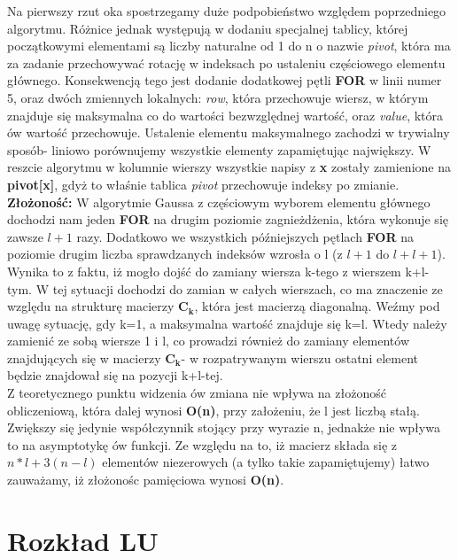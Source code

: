 \documentclass[a4paper,14pt]{report}
\begin{document}
  Na pierwszy rzut oka spostrzegamy duże podpobieństwo względem poprzedniego algorytmu. Różnice jednak występują w dodaniu specjalnej tablicy, której początkowymi elementami są liczby naturalne od 1 do n o nazwie \textit{pivot}, która ma za zadanie przechowywać rotację w indeksach po ustaleniu częściowego elementu głównego. Konsekwencją tego jest dodanie dodatkowej pętli \textbf{FOR} w linii numer 5, oraz dwóch zmiennych lokalnych: \textit{row}, która przechowuje wiersz, w którym znajduje się maksymalna co do wartości bezwzględnej wartość, oraz \textit{value}, która ów wartość przechowuje. Ustalenie elementu maksymalnego zachodzi w trywialny sposób- liniowo porównujemy wszystkie elementy zapamiętując największy. W reszcie algorytmu w kolumnie wierszy wszystkie napisy z \textbf{x} zostały zamienione na \textbf{pivot[x]}, gdyż to właśnie tablica \textit{pivot} przechowuje indeksy po zmianie.
  \textbf{Złożoność:}
  W algorytmie Gaussa z częściowym wyborem elementu głównego dochodzi nam jeden \textbf{FOR} na drugim poziomie zagnieżdżenia, która wykonuje się zawsze $l+1$ razy. Dodatkowo we wszystkich późniejszych pętlach \textbf{FOR} na poziomie drugim liczba sprawdzanych indeksów wzrosła o l (z $l+1$ do $l+l+1$). Wynika to z faktu, iż mogło dojść do zamiany wiersza k-tego z wierszem k+l-tym. W tej sytuacji dochodzi do zamian w całych wierszach, co ma znaczenie ze względu na strukturę macierzy $\mathbf{C_{k}}$, która jest macierzą diagonalną. Weźmy pod uwagę sytuację, gdy k=1, a maksymalna wartość znajduje się k=l. Wtedy należy zamienić ze sobą wiersze 1 i l, co prowadzi również do zamiany elementów znajdujących się w macierzy $\mathbf{C_{k}}$- w rozpatrywanym wierszu ostatni element będzie znajdował się na pozycji k+l-tej. \\
  Z teoretycznego punktu widzenia ów zmiana nie wpływa na złożoność obliczeniową, która dalej wynosi \textbf{O(n)}, przy założeniu, że l jest liczbą stałą. Zwiększy się jedynie współczynnik stojący przy wyrazie n, jednakże nie wpływa to na asymptotykę ów funkcji.
  Ze względu na to, iż macierz składa się z $n*l+3(n-l)$ elementów niezerowych (a tylko takie zapamiętujemy) łatwo zauważamy, iż złożonośc pamięciowa wynosi \textbf{O(n)}. 



\chapter{Rozkład LU}
\end{document}
